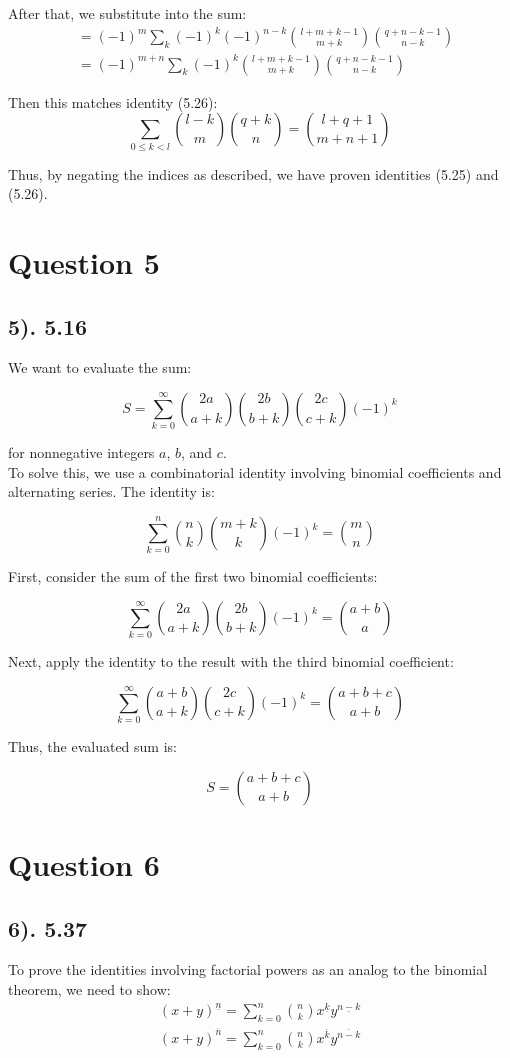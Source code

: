 \documentclass[12pt]{article}
\begin{document}
After that, we substitute into the sum:
\begin{align*}
    &= {(-1)}^m \sum_{k} {(-1)}^k {(-1)}^{n-k} \binom{l+m+k-1}{m+k} \binom{q+n-k-1}{n-k} \\
    &= {(-1)}^{m+n} \sum_{k} {(-1)}^k \binom{l+m+k-1}{m+k} \binom{q+n-k-1}{n-k}
\end{align*}

Then this matches identity (5.26):
\begin{equation}
    \sum_{0 \le k < l} \binom{l-k}{m} \binom{q+k}{n} = \binom{l+q+1}{m+n+1}
\end{equation}

Thus, by negating the indices as described, we have proven identities (5.25) and (5.26).

\section*{Question 5}
\subsection*{5). 5.16}
We want to evaluate the sum:

\[
S = \sum_{k=0}^{\infty} \binom{2a}{a+k} \binom{2b}{b+k} \binom{2c}{c+k} (-1)^k
\]

for nonnegative integers \(a\), \(b\), and \(c\). \\

To solve this, we use a combinatorial identity involving binomial coefficients and alternating series. The identity is:

\[
\sum_{k=0}^{n} \binom{n}{k} \binom{m+k}{k} (-1)^k = \binom{m}{n}
\]

First, consider the sum of the first two binomial coefficients:

\[
\sum_{k=0}^{\infty} \binom{2a}{a+k} \binom{2b}{b+k} (-1)^k = \binom{a+b}{a}
\]

Next, apply the identity to the result with the third binomial coefficient:

\[
\sum_{k=0}^{\infty} \binom{a+b}{a+k} \binom{2c}{c+k} (-1)^k = \binom{a+b+c}{a+b}
\]

Thus, the evaluated sum is:

\[
S = \binom{a+b+c}{a+b}
\]

\section*{Question 6}
\subsection*{6). 5.37}
To prove the identities involving factorial powers as an analog to the binomial theorem, we need to show:
\begin{gather*}
(x + y)^{\underline{n}} = \sum_{k=0}^{n} \binom{n}{k} x^{\underline{k}} y^{\underline{n-k}} \\
(x + y)^{\overline{n}} = \sum_{k=0}^{n} \binom{n}{k} x^{\overline{k}} y^{\overline{n-k}}
\end{gather*}
\end{document}

